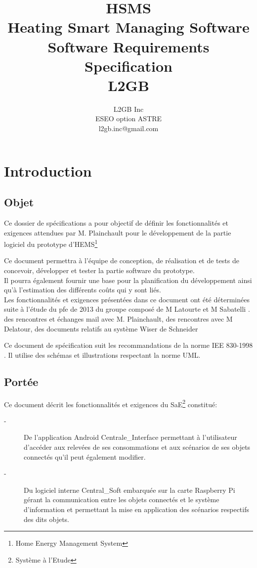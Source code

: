 \documentclass[10pt,a4paper]{report}
\author{L2GB Inc\\
		ESEO option ASTRE\\
		l2gb.inc@gmail.com
		}
\title{HSMS\\Heating Smart Managing Software  \\Software Requirements Specification\\L2GB}
\newcommand{\sommaire}{\shorttoc{Sommaire}{1}}
\begin{document}
\renewcommand{\figurename}{Illustration} 

\maketitle

\sommaire

	\chapter{Introduction}
		\section{Objet}
		
Ce dossier de spécifications a pour objectif de définir les fonctionnalités et exigences attendues par M. Plainchault pour le développement de la partie logiciel du prototype d'HEMS\footnote{Home Energy Management System} %

Ce document permettra à l'équipe de conception, de réalisation et de tests de concevoir, développer et tester la partie software du prototype.\\

Il pourra également fournir une base pour la planification du développement ainsi qu'à l'estimation des différents coûts qui y sont liés.\\

Les fonctionnalités et exigences présentées dans ce document ont été déterminées suite à l'étude du pfe de 2013 du groupe composé de M Latourte et M Sabatelli \cite{lastPfePoster}.%
des rencontres et échanges mail avec M. Plainchault, %
des rencontres avec M Delatour, 
des documents relatifs au système Wiser de Schneider  %

Ce document de spécification suit les recommandations de la norme IEE 830-1998 \cite{IEEE_830}. 
Il utilise des schémas et illustrations respectant la norme UML.

		\section{Portée}
		
Ce document décrit les fonctionnalités et exigences du SaE\footnote{Système à l'Etude} constitué:
\begin{description}
	\item[-] De l'application Android Centrale\_Interface permettant à l'utilisateur d'accéder aux relevées de ses consommations et aux scénarios de ses objets connectés qu'il peut également modifier. 
	\item[-] Du logiciel interne Central\_Soft embarquée sur la carte Raspberry Pi gérant la communication entre les objets connectés et le système d'information et permettant la mise en application des scénarios respectifs des dits objets.
\end{description}
\newpage
\end{document}
